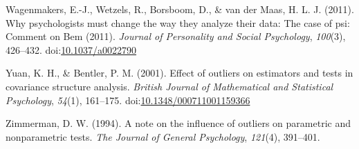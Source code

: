 \documentclass[english,,man]{apa6}
\theoremstyle{definition}
\theoremstyle{definition}
\theoremstyle{definition}
\theoremstyle{remark}
\begin{document}
\hypertarget{ref-Wagenmakers2011a}{}
Wagenmakers, E.-J., Wetzels, R., Borsboom, D., \& van der Maas, H. L. J.
(2011). Why psychologists must change the way they analyze their data:
The case of psi: Comment on Bem (2011). \emph{Journal of Personality and
Social Psychology}, \emph{100}(3), 426--432.
doi:\href{https://doi.org/10.1037/a0022790}{10.1037/a0022790}

\hypertarget{ref-Yuan2001}{}
Yuan, K. H., \& Bentler, P. M. (2001). Effect of outliers on estimators
and tests in covariance structure analysis. \emph{British Journal of
Mathematical and Statistical Psychology}, \emph{54}(1), 161--175.
doi:\href{https://doi.org/10.1348/000711001159366}{10.1348/000711001159366}

\hypertarget{ref-Zimmerman1994}{}
Zimmerman, D. W. (1994). A note on the influence of outliers on
parametric and nonparametric tests. \emph{The Journal of General
Psychology}, \emph{121}(4), 391--401.
\end{document}
